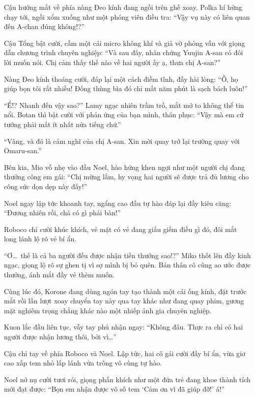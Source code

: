 \documentclass[../main.tex]{subfiles}
\begin{document}
Cậu hướng mắt về phía nàng Đeo kính đang ngồi trên ghế xoay. Polka hí hửng chạy tới, ngồi xổm xuống như một phóng viên điều tra: ``Vậy vụ này có liên quan đến A-chan đúng không!?''

Cậu Tổng bật cười, cầm một cái micro không khí và giả vờ phỏng vấn với giọng dẫn chương trình chuyên nghiệp: ``Và sau đây, nhân chứng Yuujin A-san có đôi lời muốn nói. Chị cảm thấy thế nào về hai người ấy ạ, thưa chị A-san?''

Nàng Đeo kính thoáng cười, đáp lại một cách điềm tĩnh, đầy hài lòng: ``Ồ, họ giúp bọn tôi rất nhiều! Đống thùng bìa đó chỉ mất năm phút là sạch bách luôn!''

``Ể!? Nhanh đến vậy sao?'' Lamy ngạc nhiên trầm trồ, mắt mở to không thể tin nổi. Botan thì bật cười với phản ứng của bạn mình, thán phục: ``Vậy mà em cứ tưởng phải mất ít nhất nửa tiếng chứ.''

``Vâng, và đó là cảm nghĩ của chị A-san. Xin mời quay trở lại trường quay với Omaru-san.''

Bên kia, Mio vỗ nhẹ vào đầu Noel, hào hứng khen ngợi như một người chị đang thưởng công em gái: ``Chị mừng lắm, hy vọng hai người sẽ được trả đủ lương cho công sức dọn dẹp này đấy!''

Noel ngay lập tức khoanh tay, ngẩng cao đầu tự hào đáp lại đầy kiêu căng: ``Đương nhiên rồi, chả có gì phải bàn!''

Roboco chỉ cười khúc khích, vẻ mặt có vẻ đang giấu giếm điều gì đó, đôi mắt long lánh lộ rõ vẻ bí ẩn.

``Ơ\dots\ thế là cả ba người đều được nhận tiền thưởng sao!?'' Miko thốt lên đầy kinh ngạc, giọng lộ rõ sự ghen tị vì sợ mình bị bỏ quên. Bản thân cô cũng ao ước được thưởng, ánh mắt đầy vẻ thèm muốn.

Cùng lúc đó, Korone đang dùng ngón tay tạo thành một cái ống kính, đặt trước mắt rồi lần lượt xoay chuyển tay này qua tay khác như đang quay phim, gương mặt nghiêm trọng chẳng khác nào một nhiếp ảnh gia chuyên nghiệp.

Kuon lắc đầu liên tục, vẫy tay phủ nhận ngay: ``Không đâu. Thực ra chỉ có hai người được nhận lương thôi, bởi vì\dots''

Cậu chỉ tay về phía Roboco và Noel. Lập tức, hai cô gái cười đầy bí ẩn, vừa giơ cao xấp tem nhỏ lấp lánh vừa trông vô cùng tự hào.

Noel nở nụ cười tươi rói, giọng phấn khích như một đứa trẻ đang khoe thành tích mới đạt được: ``Bọn em nhận được vô số tem `Cảm ơn vì đã giúp đỡ!' á!''
\end{document}
